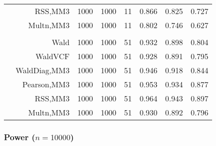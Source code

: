 \documentclass[
]{article}
\begin{document}
\begin{table}[H]
{\begin{tabular}[t]{lrrrrrrr}
\hspace{1em} & RSS,MM3 & 1000 & 1000 & 11 & 0.866 & 0.825 & 0.727\\

\hspace{1em} & Multn,MM3 & 1000 & 1000 & 11 & 0.802 & 0.746 & 0.627\\
\cmidrule{1-8}
\addlinespace[0.3em]
\multicolumn{8}{l}{\textbf{3F 15V}}\\
\hspace{1em} & Wald & 1000 & 1000 & 51 & 0.932 & 0.898 & 0.804\\

\hspace{1em} & WaldVCF & 1000 & 1000 & 51 & 0.928 & 0.891 & 0.795\\

\hspace{1em} & WaldDiag,MM3 & 1000 & 1000 & 51 & 0.946 & 0.918 & 0.844\\

\hspace{1em} & Pearson,MM3 & 1000 & 1000 & 51 & 0.953 & 0.934 & 0.877\\

\hspace{1em} & RSS,MM3 & 1000 & 1000 & 51 & 0.964 & 0.943 & 0.897\\

\hspace{1em} & Multn,MM3 & 1000 & 1000 & 51 & 0.930 & 0.892 & 0.796\\
\bottomrule
\end{tabular}}
\endgroup{}
\end{table}

\hypertarget{power-n10000}{%
\subsubsection{\texorpdfstring{Power
(\(n=10000\))}{Power (n=10000)}}\label{power-n10000}}
\end{document}
